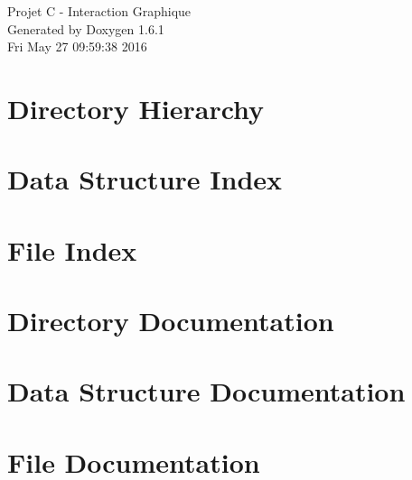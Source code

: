 \documentclass[a4paper]{book}
\begin{document}
\hypersetup{pageanchor=false}
\begin{titlepage}
\vspace*{7cm}
\begin{center}
{\Large Projet C -\/ Interaction Graphique }\\
\vspace*{1cm}
{\large Generated by Doxygen 1.6.1}\\
\vspace*{0.5cm}
{\small Fri May 27 09:59:38 2016}\\
\end{center}
\end{titlepage}
\clearemptydoublepage
{}
\tableofcontents
\clearemptydoublepage
{}
\hypersetup{pageanchor=true}
\chapter{Directory Hierarchy}

\chapter{Data Structure Index}

\chapter{File Index}

\chapter{Directory Documentation}

\chapter{Data Structure Documentation}















\chapter{File Documentation}











\printindex
\end{document}
